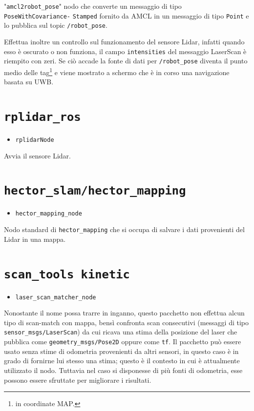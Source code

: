 "\texttt{amcl2robot\_pose}" nodo che converte un messaggio di tipo \texttt{PoseWithCovariance-} \texttt{Stamped} fornito da AMCL in un messaggio di tipo \texttt{Point} e lo pubblica sul topic \texttt{/robot\_pose}.

Effettua inoltre un controllo sul funzionamento del sensore Lidar, infatti quando esso è oscurato o non funziona, il campo \verb!intensities! del messaggio LaserScan è riempito con zeri. Se ciò accade la fonte di dati per \texttt{/robot\_pose} diventa il punto medio delle tag\footnote{in coordinate MAP.} e viene mostrato a schermo che è in corso una navigazione basata su UWB.


\section*{\texttt{rplidar\_ros}}

\begin{itemize}
    \item \verb!rplidarNode!
\end{itemize}

Avvia il sensore Lidar.

\section*{\texttt{hector\_slam/hector\_mapping}}
\begin{itemize}
    \item \verb!hector_mapping_node!
\end{itemize}
Nodo standard di \texttt{hector\_mapping} che si occupa di salvare i dati provenienti del Lidar in una mappa.


\section*{\texttt{scan\_tools \- kinetic}}
\begin{itemize}
    \item \verb!laser_scan_matcher_node!
\end{itemize}
Nonostante il nome possa trarre in inganno, questo pacchetto non effettua alcun tipo di scan-match con mappa, bensì confronta scan consecutivi (messaggi di tipo \verb!sensor_msgs/LaserScan!) da cui ricava una stima della posizione del laser che pubblica come \verb!geometry_msgs/Pose2D! oppure come \verb!tf!. 
Il pacchetto può essere usato senza stime di odometria provenienti da altri sensori, in questo caso è in grado di fornirne lui stesso una stima; questo è il contesto in cui è attualmente utilizzato il nodo.
Tuttavia nel caso si disponesse di più fonti di odometria, esse possono essere sfruttate per migliorare i risultati.



